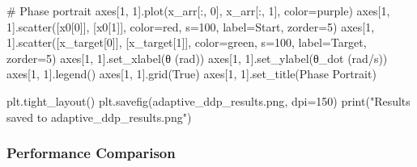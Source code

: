 \documentclass[
  letterpaper,
  DIV=11,
  numbers=noendperiod]{scrartcl}
\newenvironment{Shaded}{\begin{snugshade}}{\end{snugshade}}
\newcommand{\BuiltInTok}[1]{\textcolor[rgb]{0.00,0.23,0.31}{#1}}
\newcommand{\CommentTok}[1]{\textcolor[rgb]{0.37,0.37,0.37}{#1}}
\newcommand{\DecValTok}[1]{\textcolor[rgb]{0.68,0.00,0.00}{#1}}
\newcommand{\NormalTok}[1]{\textcolor[rgb]{0.00,0.23,0.31}{#1}}
\newcommand{\OperatorTok}[1]{\textcolor[rgb]{0.37,0.37,0.37}{#1}}
\newcommand{\StringTok}[1]{\textcolor[rgb]{0.13,0.47,0.30}{#1}}
\newcommand{\VariableTok}[1]{\textcolor[rgb]{0.07,0.07,0.07}{#1}}
\begin{document}
\begin{Shaded}
\begin{Highlighting}[]
    \CommentTok{\# Phase portrait}
\NormalTok{    axes[}\DecValTok{1}\NormalTok{, }\DecValTok{1}\NormalTok{].plot(x\_arr[:, }\DecValTok{0}\NormalTok{], x\_arr[:, }\DecValTok{1}\NormalTok{], color}\OperatorTok{=}\StringTok{\textquotesingle{}purple\textquotesingle{}}\NormalTok{)}
\NormalTok{    axes[}\DecValTok{1}\NormalTok{, }\DecValTok{1}\NormalTok{].scatter([x0[}\DecValTok{0}\NormalTok{]], [x0[}\DecValTok{1}\NormalTok{]], color}\OperatorTok{=}\StringTok{\textquotesingle{}red\textquotesingle{}}\NormalTok{, s}\OperatorTok{=}\DecValTok{100}\NormalTok{,}
\NormalTok{                       label}\OperatorTok{=}\StringTok{\textquotesingle{}Start\textquotesingle{}}\NormalTok{, zorder}\OperatorTok{=}\DecValTok{5}\NormalTok{)}
\NormalTok{    axes[}\DecValTok{1}\NormalTok{, }\DecValTok{1}\NormalTok{].scatter([x\_target[}\DecValTok{0}\NormalTok{]], [x\_target[}\DecValTok{1}\NormalTok{]], color}\OperatorTok{=}\StringTok{\textquotesingle{}green\textquotesingle{}}\NormalTok{,}
\NormalTok{                       s}\OperatorTok{=}\DecValTok{100}\NormalTok{, label}\OperatorTok{=}\StringTok{\textquotesingle{}Target\textquotesingle{}}\NormalTok{, zorder}\OperatorTok{=}\DecValTok{5}\NormalTok{)}
\NormalTok{    axes[}\DecValTok{1}\NormalTok{, }\DecValTok{1}\NormalTok{].set\_xlabel(}\StringTok{\textquotesingle{}θ (rad)\textquotesingle{}}\NormalTok{)}
\NormalTok{    axes[}\DecValTok{1}\NormalTok{, }\DecValTok{1}\NormalTok{].set\_ylabel(}\StringTok{\textquotesingle{}θ\_dot (rad/s)\textquotesingle{}}\NormalTok{)}
\NormalTok{    axes[}\DecValTok{1}\NormalTok{, }\DecValTok{1}\NormalTok{].legend()}
\NormalTok{    axes[}\DecValTok{1}\NormalTok{, }\DecValTok{1}\NormalTok{].grid(}\VariableTok{True}\NormalTok{)}
\NormalTok{    axes[}\DecValTok{1}\NormalTok{, }\DecValTok{1}\NormalTok{].set\_title(}\StringTok{\textquotesingle{}Phase Portrait\textquotesingle{}}\NormalTok{)}

\NormalTok{    plt.tight\_layout()}
\NormalTok{    plt.savefig(}\StringTok{\textquotesingle{}adaptive\_ddp\_results.png\textquotesingle{}}\NormalTok{, dpi}\OperatorTok{=}\DecValTok{150}\NormalTok{)}
    \BuiltInTok{print}\NormalTok{(}\StringTok{"Results saved to adaptive\_ddp\_results.png"}\NormalTok{)}
\end{Highlighting}
\end{Shaded}

\subsubsection{Performance Comparison}\label{performance-comparison}
\end{document}
